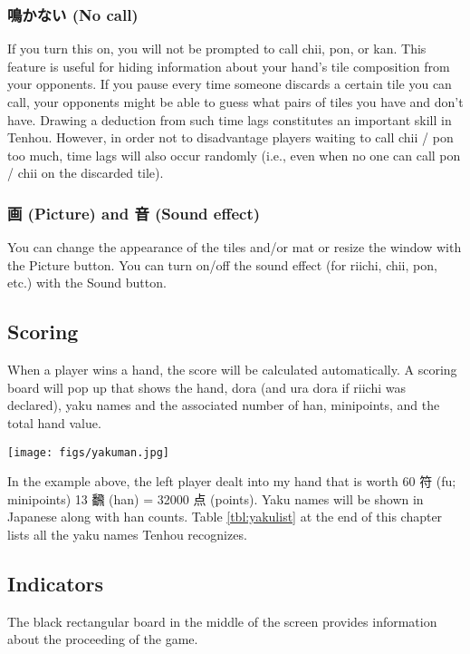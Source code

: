 \subsubsection{鳴かない (No call)}
If you turn this on, you will not be prompted to call {\jap chii}, {\jap pon}, or {\jap kan}. This feature is useful for hiding information about your hand's tile composition from your opponents. If you pause every time someone discards a certain tile you can call, your opponents might be able to guess what pairs of tiles you have and don't have. Drawing a deduction from such time lags constitutes an important skill in {\jap Tenhou}. However, in order not to disadvantage players waiting to call {\jap chii} / {\jap pon} too much, time lags will also occur randomly (i.e., even when no one can call {\jap pon} / {\jap chii} on the discarded tile). 

\subsubsection{画 (Picture) and 音 (Sound effect)}
You can change the appearance of the tiles and/or mat or resize the window with the Picture button. You can turn on/off the sound effect (for riichi, {\jap chii}, {\jap pon}, etc.) with the Sound button.

\bigskip

\subsection{Scoring}
When a player wins a hand, the score will be calculated automatically. A scoring board will pop up that shows the hand, {\jap dora} (and {\jap ura dora} if riichi was declared), {\jap yaku} names and the associated number of {\jap han}, minipoints, and the total hand value. 
\newpage

\begin{center}
\texttt{[image: figs/yakuman.jpg]}
\end{center}

In the example above, the left player dealt into my hand that is worth 60 符 ({\jap fu}; minipoints) 13 飜 ({\jap han}) = 32000 点 (points). {\jap Yaku} names will be shown in Japanese along with {\jap han} counts. 
Table \ref{tbl:yakulist} at the end of this chapter lists all the {\jap yaku} names {\jap Tenhou} recognizes. 

\bigskip

\subsection{Indicators}\label{sec:indicator}
The black rectangular board in the middle of the screen provides information about the proceeding of the game. 


